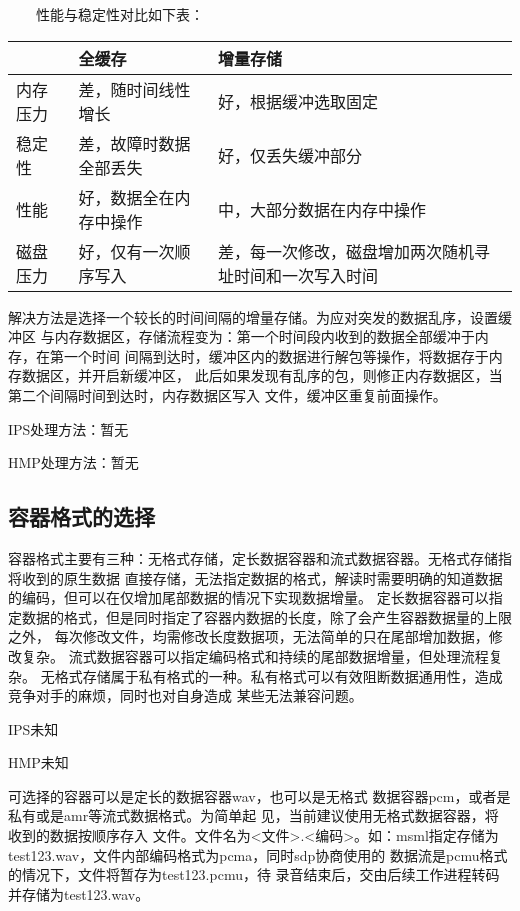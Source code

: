 \documentclass[11pt]{article}
\begin{document}
　　性能与稳定性对比如下表：
\begin{table}[htbp]
\begin{tabularx}{350pt}{|l|X|X|}
\hline          & 全缓存                & 增量存储\\
\hline 内存压力 & 差，随时间线性增长    & 好，根据缓冲选取固定 \\
\hline 稳定性   & 差，故障时数据全部丢失& 好，仅丢失缓冲部分  \\
\hline 性能     & 好，数据全在内存中操作& 中，大部分数据在内存中操作  \\
\hline 磁盘压力 & 好，仅有一次顺序写入  & 差，每一次修改，磁盘增加两次随机寻址时间和一次写入时间  \\
\hline
\end{tabularx}
\end{table}

    解决方法是选择一个较长的时间间隔的增量存储。为应对突发的数据乱序，设置缓冲区
与内存数据区，存储流程变为：第一个时间段内收到的数据全部缓冲于内存，在第一个时间
间隔到达时，缓冲区内的数据进行解包等操作，将数据存于内存数据区，并开启新缓冲区，
此后如果发现有乱序的包，则修正内存数据区，当第二个间隔时间到达时，内存数据区写入
文件，缓冲区重复前面操作。

    IPS处理方法：暂无

    HMP处理方法：暂无
\subsection{容器格式的选择}
    容器格式主要有三种：无格式存储，定长数据容器和流式数据容器。无格式存储指将收到的原生数据
直接存储，无法指定数据的格式，解读时需要明确的知道数据的编码，但可以在仅增加尾部数据的情况下实现数据增量。
定长数据容器可以指定数据的格式，但是同时指定了容器内数据的长度，除了会产生容器数据量的上限之外，
每次修改文件，均需修改长度数据项，无法简单的只在尾部增加数据，修改复杂。
流式数据容器可以指定编码格式和持续的尾部数据增量，但处理流程复杂。
无格式存储属于私有格式的一种。私有格式可以有效阻断数据通用性，造成竞争对手的麻烦，同时也对自身造成
某些无法兼容问题。

    IPS未知

    HMP未知

    可选择的容器可以是定长的数据容器wav，也可以是无格式
数据容器pcm，或者是私有或是amr等流式数据格式。为简单起
见，当前建议使用无格式数据容器，将收到的数据按顺序存入
文件。文件名为<文件>.<编码>。如：msml指定存储为
test123.wav，文件内部编码格式为pcma，同时sdp协商使用的
数据流是pcmu格式的情况下，文件将暂存为test123.pcmu，待
录音结束后，交由后续工作进程转码并存储为test123.wav。
\end{document}
